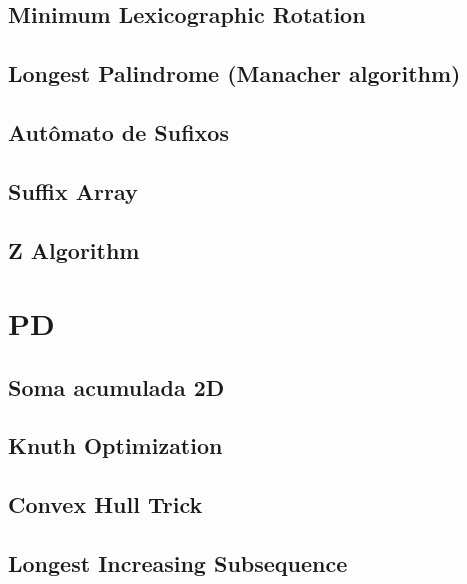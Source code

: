 \subsection{Minimum Lexicographic Rotation}
\raggedbottom
\hrulefill
\subsection{Longest Palindrome (Manacher algorithm)}
\raggedbottom
\hrulefill
\subsection{Autômato de Sufixos}
\raggedbottom
\hrulefill
\subsection{Suffix Array}
\raggedbottom
\hrulefill
\subsection{Z Algorithm}
\raggedbottom
\hrulefill

\section{PD}
\subsection{Soma acumulada 2D}
\raggedbottom
\hrulefill
\subsection{Knuth Optimization}
\raggedbottom
\hrulefill
\subsection{Convex Hull Trick}
\raggedbottom
\hrulefill
\subsection{Longest Increasing Subsequence}
\raggedbottom
\hrulefill

